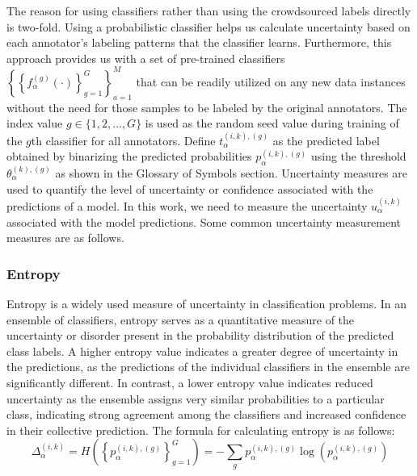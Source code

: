 The reason for using classifiers rather than using the crowdsourced labels directly is two-fold. Using a probabilistic classifier helps us calculate uncertainty based on each annotator's labeling patterns that the classifier learns. Furthermore, this approach provides us with a set of pre-trained classifiers ${\left\{ {\left\{f_{\alpha}^{(g)}(\cdot) \right\}}_{g=1}^G  \right\}}_{a=1}^{M} $ that can be readily utilized on any new data instances without the need for those samples to be labeled by the original annotators.
The index value $g  \in \{1,2,\dots,G\} $ is used as the random seed value during training of the $g$\-th classifier for all annotators.
Define $t_{\alpha}^{(i,k),(g)} $ as the predicted label obtained by binarizing the predicted probabilities $p_{\alpha}^{ (i,k),(g)} $ using the threshold $\theta_{\alpha}^{(k),(g)} $ as shown in the Glossary of Symbols section.
Uncertainty measures are used to quantify the level of uncertainty or confidence associated with the predictions of a model. In this work, we need to measure the uncertainty $u_{\alpha}^{(i,k)}$ associated with the model predictions. Some common uncertainty measurement measures are as follows.

\subsubsection{Entropy}
Entropy is a widely used measure of uncertainty in classification problems. In an ensemble of classifiers, entropy serves as a quantitative measure of the uncertainty or disorder present in the probability distribution of the predicted class labels. A higher entropy value indicates a greater degree of uncertainty in the predictions, as the predictions of the individual classifiers in the ensemble are significantly different. In contrast, a lower entropy value indicates reduced uncertainty as the ensemble assigns very similar probabilities to a particular class, indicating strong agreement among the classifiers and increased confidence in their collective prediction. The formula for calculating entropy is as follows:
\begin{equation}
\Delta_{\alpha}^{(i,k)} = H\left({\left\{p_{\alpha}^{(i,k),(g)}\right\}}_{g=1}^{G}\right)=-\sum_{g}{p_{\alpha}^{(i,k),(g)} \log\left(p_{\alpha}^{(i,k),(g)}\right)}
\label{eq:crowd.Eq.5.uncertainty}
\end{equation}

